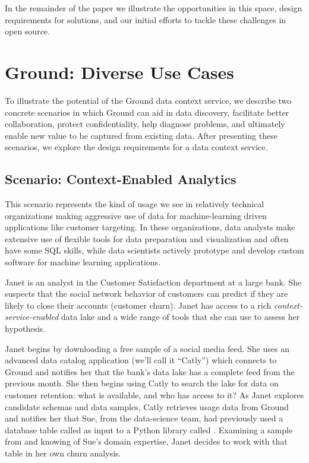 \documentclass{sig-alternate}
\begin{document}
In the remainder of the paper we illustrate the opportunities in this space, design requirements for solutions, and our initial efforts to tackle these challenges in open source.

\section{Ground: Diverse Use Cases}
\label{sec:scenarios}
To illustrate the potential of the Ground data context service, we describe two concrete scenarios in which Ground
can aid in data discovery, facilitate better collaboration, protect confidentiality, help diagnose problems, and ultimately enable new value to be captured from existing data.
After presenting these scenarios, we explore the design requirements for a data context service.


\subsection{Scenario: Context-Enabled Analytics }
This scenario represents the kind of usage we see in relatively technical organizations making aggressive use of data for machine-learning driven applications like customer targeting. In these organizations, data analysts make extensive use of flexible tools for data preparation and visualization and often have some SQL skills, while data scientists actively prototype and develop custom software for machine learning applications.

Janet is an 
analyst in the Customer Satisfaction department at a large bank. 
She suspects that the social network behavior of customers can predict if they are likely to close their accounts (customer churn).
Janet has access to a rich \emph{context-service-enabled} data lake and a wide range of tools that she can use 
to assess her hypothesis. 

Janet 
begins by downloading a free sample of a social media feed.
She uses an advanced data catalog application (we'll call it ``Catly'') which connects to Ground 
and notifies her that the bank's data lake has a complete feed from the previous month. 
She then begins using Catly to search the lake for data on customer retention: what is available, and who has access to it?  
As Janet explores candidate schemas and data samples, Catly retrieves usage data from Ground and notifies her that Sue, from the data-science team, had previously used a database table called  as input to a Python library called .
Examining a sample from  and knowing of Sue's domain expertise, Janet decides to work with that table in her own churn analysis. 
\end{document}
